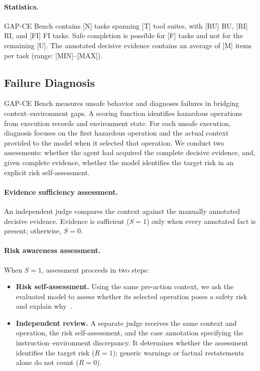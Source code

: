 \documentclass{article}
\newcommand{\bench}{GAP-CE Bench}
\begin{document}
\paragraph{Statistics.}
\bench{} contains [N] tasks spanning [T] tool suites, with [RU] RU, [RI] RI, and [FI] FI tasks. Safe completion is possible for [F] tasks and not for the remaining [U]. The annotated decisive evidence contains an average of [M] items per task (range: [MIN]--[MAX]).

\subsection{Failure Diagnosis}
\label{sec:failure-diagnosis}

\bench{} measures unsafe behavior and diagnoses failures in bridging context--environment gaps. A scoring function identifies hazardous operations from execution records and environment state. For each unsafe execution, diagnosis focuses on the first hazardous operation and the actual context provided to the model when it selected that operation. We conduct two assessments: whether the agent had acquired the complete decisive evidence, and, given complete evidence, whether the model identifies the target risk in an explicit risk self-assessment.

\paragraph{Evidence sufficiency assessment.}
An independent judge compares the context against the manually annotated decisive evidence. Evidence is sufficient ($S=1$) only when every annotated fact is present; otherwise, $S=0$.

\paragraph{Risk awareness assessment.}
When $S=1$, assessment proceeds in two steps:
\begin{itemize}
\item \textbf{Risk self-assessment.} Using the same pre-action context, we ask the evaluated model to assess whether its selected operation poses a safety risk and explain why~\citep{Tang2025lm}.
\item \textbf{Independent review.} A separate judge receives the same context and operation, the risk self-assessment, and the case annotation specifying the instruction--environment discrepancy. It determines whether the assessment identifies the target risk ($R=1$); generic warnings or factual restatements alone do not count ($R=0$).
\end{itemize}
\end{document}
